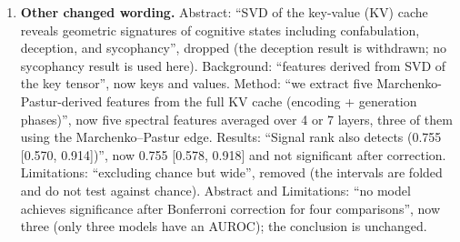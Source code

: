 \documentclass[11pt,a4paper]{article}
\begin{document}
\begin{enumerate}
\item \textbf{Other changed wording.} Abstract: ``SVD of the key-value
(KV) cache reveals geometric signatures of cognitive states including
confabulation, deception, and sycophancy'', dropped (the deception result
is withdrawn; no sycophancy result is used here). Background:
``features derived from SVD of the key tensor'', now keys and values.
Method: ``we extract five Marchenko-Pastur-derived features from the full
KV cache (encoding + generation phases)'', now five spectral features
averaged over 4 or 7 layers, three of them using the Marchenko--Pastur
edge. Results: ``Signal rank also detects (0.755 [0.570, 0.914])'', now
0.755 [0.578, 0.918] and not significant after correction. Limitations:
``excluding chance but wide'', removed (the intervals are folded and do
not test against chance). Abstract and Limitations: ``no model achieves
significance after Bonferroni correction for four comparisons'', now three
(only three models have an AUROC); the conclusion is unchanged.
\end{enumerate}
\end{document}
